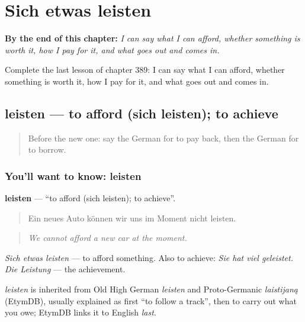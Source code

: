 
\chapter{Sich etwas leisten}
\label{ch:ge-sich-etwas-leisten}

\begin{chapteropening}
\textbf{By the end of this chapter:} \emph{I can say what I can afford, whether something is worth it, how I pay for it, and what goes out and comes in.}

Complete the last lesson of chapter 389: I can say what I can afford, whether something is worth it, how I pay for it, and what goes out and comes in.
\end{chapteropening}

\section[leisten]{leisten — to afford (sich leisten); to achieve}

\label{lesson:GE-C389-leisten}



\begin{quote}
Before the new one: say the German for to pay back, then the German for to borrow.
\end{quote}

\subsection*{You'll want to know: leisten}
\textbf{leisten} — \textquotedblleft{}to afford (sich leisten); to achieve\textquotedblright{}.

\begin{quote}
Ein neues Auto können wir uns im Moment nicht leisten.
\end{quote}

\begin{quote}
\emph{We cannot afford a new car at the moment.}
\end{quote}

\emph{Sich etwas leisten} — to afford something. Also to achieve: \emph{Sie hat viel geleistet.} \emph{Die Leistung} — the achievement.

\begin{cousinweb}
\emph{leisten} is inherited from Old High German \emph{leisten} and Proto-Germanic \emph{laistijaną} (EtymDB), usually explained as first \textquotedblleft{}to follow a track\textquotedblright{}, then to carry out what you owe; EtymDB links it to English \emph{last}.
\end{cousinweb}

